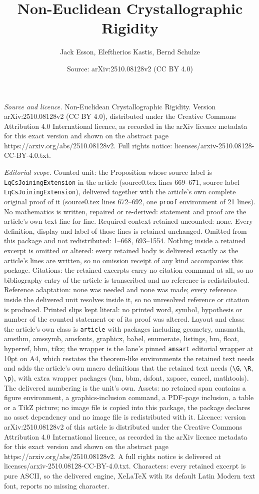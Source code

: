 \documentclass[10pt,a4paper]{amsart}
\title[Non-Euclidean Crystallographic Rigidity]{Non-Euclidean Crystallographic Rigidity}
\author{Jack Esson, Eleftherios Kastis, Bernd Schulze}
\date{Source: arXiv:2510.08128v2 (CC BY 4.0)}
\begin{document}
\maketitle

\noindent\emph{Source and licence.} Non-Euclidean Crystallographic Rigidity. Version arXiv:2510.08128v2 (CC BY 4.0), distributed under the Creative Commons Attribution 4.0 International licence, as recorded in the arXiv licence metadata for this exact version and shown on the abstract page https://arxiv.org/abs/2510.08128v2. Full rights notice: licenses/arxiv-2510.08128-CC-BY-4.0.txt.\par\smallskip

\noindent\textit{Editorial scope.} Counted unit: the Proposition whose source label is \texttt{LqCsJoiningExtension} in the article (source0.tex lines 669--671, source label \texttt{LqCsJoiningExtension}), delivered together with the article's own complete original proof of it (source0.tex lines 672--692, one \texttt{proof} environment of 21 lines). No mathematics is written, repaired or re-derived: statement and proof are the article's own text line for line. Required context retained uncounted: none. Every definition, display and label of those lines is retained unchanged. Omitted from this package and not redistributed: 1--668, 693--1554. Nothing inside a retained excerpt is omitted or altered: every retained body is delivered exactly as the article's lines are written, so no omission receipt of any kind accompanies this package. Citations: the retained excerpts carry no citation command at all, so no bibliography entry of the article is transcribed and no reference is redistributed. Reference adaptation: none was needed and none was made; every reference inside the delivered unit resolves inside it, so no unresolved reference or citation is produced. Printed slips kept literal: no printed word, symbol, hypothesis or number of the counted statement or of its proof was altered. Layout and class: the article's own class is \texttt{article} with packages including geometry, amsmath, amsthm, amssymb, amsfonts, graphicx, babel, enumerate, listings, bm, float, hyperref, bbm, tikz; the wrapper is the lane's pinned \texttt{amsart} editorial wrapper at 10pt on A4, which restates the theorem-like environments the retained text needs and adds the article's own macro definitions that the retained text needs (\texttt{\textbackslash G}, \texttt{\textbackslash R}, \texttt{\textbackslash p}), with extra wrapper packages (bm, bbm, dsfont, xspace, cancel, mathtools). The delivered numbering is the unit's own. Assets: no retained span contains a figure environment, a graphics-inclusion command, a PDF-page inclusion, a table or a TikZ picture; no image file is copied into this package, the package declares no asset dependency and no image file is redistributed with it. Licence: version arXiv:2510.08128v2 of this article is distributed under the Creative Commons Attribution 4.0 International licence, as recorded in the arXiv licence metadata for this exact version and shown on the abstract page https://arxiv.org/abs/2510.08128v2. A full rights notice is delivered at licenses/arxiv-2510.08128-CC-BY-4.0.txt. Characters: every retained excerpt is pure ASCII, so the delivered engine, XeLaTeX with its default Latin Modern text font, reports no missing character.
\end{document}
